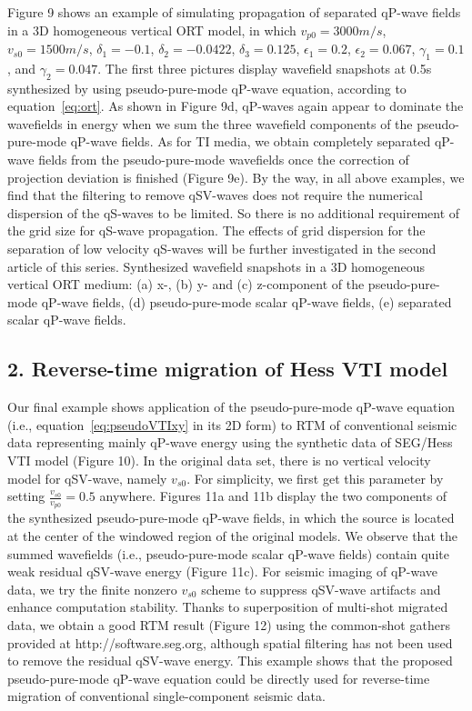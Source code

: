 Figure 9 shows an example of simulating propagation of separated qP-wave fields in a 3D homogeneous
 vertical ORT model, in which $v_{p0}=3000 m/s$,
$v_{s0}=1500 m/s$, $\delta_{1}=-0.1$, $\delta_{2}=-0.0422$, $\delta_{3}=0.125$, $\epsilon_{1}=0.2$,
$\epsilon_{2}=0.067$, $\gamma_{1}=0.1$, and $\gamma_{2}=0.047$.
The first three pictures display wavefield snapshots at 0.5s synthesized by using
 pseudo-pure-mode qP-wave equation, according to equation~\ref{eq:ort}.
As shown in Figure 9d, qP-waves again appear to dominate the wavefields in energy when we sum the 
three wavefield components of the pseudo-pure-mode qP-wave fields.
As for TI media, we obtain completely separated qP-wave fields from the
 pseudo-pure-mode wavefields once the correction of projection deviation is finished (Figure 9e).
By the way, in all above examples, we find that the filtering to remove qSV-waves does not
require the numerical dispersion of the qS-waves to be limited. So there is no additional requirement
of the grid size for qS-wave propagation. The effects of grid dispersion for the separation of low velocity
qS-waves will be further investigated in the second article of this series.
{
Synthesized wavefield snapshots in a 3D homogeneous vertical ORT medium: (a) x-, (b) y- and (c) z-component
 of the pseudo-pure-mode qP-wave fields, (d) pseudo-pure-mode scalar qP-wave fields, (e) separated scalar qP-wave fields.
}

\subsection{2. Reverse-time migration of Hess VTI model}

Our final example shows application of the pseudo-pure-mode qP-wave equation (i.e., equation~\ref{eq:pseudoVTIxy} in its 2D form) 
 to RTM of conventional seismic data representing mainly qP-wave energy using the synthetic data of
 SEG/Hess VTI model (Figure 10).
In the original data set, there is no vertical velocity model for qSV-wave, namely $v_{s0}$.
 For simplicity, we first get this parameter by setting $\frac{v_{s0}}{v_{p0}}=0.5$ anywhere.
Figures 11a and 11b display the two components of the synthesized pseudo-pure-mode qP-wave fields,
 in which the source is located at the center of the windowed region of the original models. 
 We observe that the summed wavefields (i.e., pseudo-pure-mode scalar qP-wave fields) contain quite weak
 residual qSV-wave energy (Figure 11c).
For seismic imaging of qP-wave data, we try the finite nonzero $v_{s0}$ scheme \cite[]{fletcher:2009}
 to suppress qSV-wave artifacts and enhance computation stability.
Thanks to superposition of multi-shot migrated data, we obtain a good RTM result (Figure 12) 
using the common-shot gathers provided at http://software.seg.org, although spatial filtering
has not been used to remove the residual qSV-wave energy. This example shows that the proposed pseudo-pure-mode
qP-wave equation could be directly used for reverse-time migration of conventional single-component seismic data.

